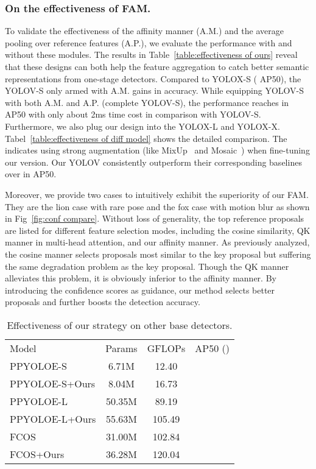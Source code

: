 \documentclass[letterpaper]{article} \usepackage{aaai23}  \usepackage{times}  \usepackage{helvet}  \usepackage{courier}  \usepackage[hyphens]{url}  \usepackage{graphicx} \urlstyle{rm} \def\UrlFont{\rm}  \usepackage{natbib}  \usepackage{caption} \usepackage{xcolor}
\begin{document}
\subsubsection{On the effectiveness of FAM.} To validate the effectiveness of the affinity manner (A.M.) and the average pooling over reference features (A.P.), we evaluate the performance with and without these modules. The results in Table~\ref{table:effectiveness of ours} reveal that these designs can both help the feature aggregation to catch better semantic representations from one-stage detectors. Compared to YOLOX-S ( AP50), the YOLOV-S only armed with A.M. gains  in accuracy. While equipping YOLOV-S with both A.M. and A.P. (complete YOLOV-S), the performance reaches  in AP50 with only about 2ms time cost in comparison with YOLOV-S. Furthermore, we also plug our design into the YOLOX-L and YOLOX-X. Tabel~\ref{table:effectiveness of diff model} shows the detailed comparison. The  indicates using strong augmentation (like MixUp~\cite{zhang2018mixup} and Mosaic~\cite{bochkovskiy2020yolov4}) when fine-tuning our version. Our YOLOV consistently outperform their corresponding baselines over  in AP50. 

Moreover, we provide two cases to intuitively exhibit the superiority of our FAM. They are the lion case with rare pose and the fox case with motion blur as shown in Fig~\ref{fig:conf compare}. Without loss of generality, the top  reference proposals are listed for different feature selection modes, including the cosine similarity, QK manner in multi-head attention, and our affinity manner. As previously analyzed, the cosine manner selects proposals most similar to the key proposal but suffering the same degradation problem as the key proposal. Though the QK manner alleviates this problem, it is obviously inferior to the affinity manner. By introducing the confidence scores as guidance, our method selects better proposals and further boosts the detection accuracy. 


\setlength{\tabcolsep}{4pt}
\begin{table}[t]
\begin{center}
\begin{tabular}{l|ccl}
\hline\noalign{\smallskip}
Model&Params&GFLOPs&AP50 ()\\
\noalign{\smallskip}
\hline
\noalign{\smallskip}
PPYOLOE-S & 6.71M & 12.40 &\\
PPYOLOE-S+Ours & 8.04M & 16.73 & \\
PPYOLOE-L & 50.35M & 89.19  &  \\
PPYOLOE-L+Ours & 55.63M & 105.49 &   \\
FCOS & 31.00M & 102.84& \\
FCOS+Ours & 36.28M & 120.04 & \\
\hline
\end{tabular}
\end{center}
\caption{Effectiveness of our strategy on other base detectors.}
\label{table:effectiveness of diff detector}
\end{table}
\setlength{\tabcolsep}{1.4pt}
\end{document}
